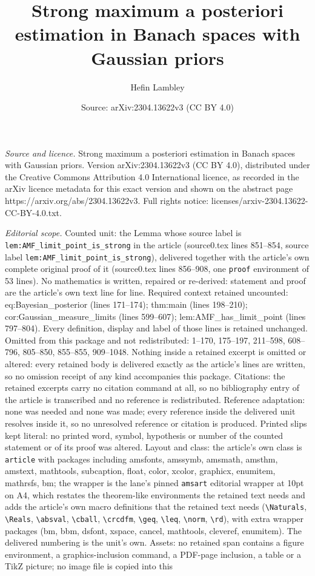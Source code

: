 \documentclass[10pt,a4paper]{amsart}
\title[Strong maximum a posteriori estimation in Banach spaces with]{Strong maximum a posteriori estimation in Banach spaces with Gaussian priors}
\author{Hefin Lambley}
\date{Source: arXiv:2304.13622v3 (CC BY 4.0)}
\begin{document}
\maketitle

\noindent\emph{Source and licence.} Strong maximum a posteriori estimation in Banach spaces with Gaussian priors. Version arXiv:2304.13622v3 (CC BY 4.0), distributed under the Creative Commons Attribution 4.0 International licence, as recorded in the arXiv licence metadata for this exact version and shown on the abstract page https://arxiv.org/abs/2304.13622v3. Full rights notice: licenses/arxiv-2304.13622-CC-BY-4.0.txt.\par\smallskip

\noindent\textit{Editorial scope.} Counted unit: the Lemma whose source label is \texttt{lem:AMF\_limit\_point\_is\_strong} in the article (source0.tex lines 851--854, source label \texttt{lem:AMF\_limit\_point\_is\_strong}), delivered together with the article's own complete original proof of it (source0.tex lines 856--908, one \texttt{proof} environment of 53 lines). No mathematics is written, repaired or re-derived: statement and proof are the article's own text line for line. Required context retained uncounted: eq:Bayesian\_posterior (lines 171--174); thm:main (lines 198--210); cor:Gaussian\_measure\_limits (lines 599--607); lem:AMF\_has\_limit\_point (lines 797--804). Every definition, display and label of those lines is retained unchanged. Omitted from this package and not redistributed: 1--170, 175--197, 211--598, 608--796, 805--850, 855--855, 909--1048. Nothing inside a retained excerpt is omitted or altered: every retained body is delivered exactly as the article's lines are written, so no omission receipt of any kind accompanies this package. Citations: the retained excerpts carry no citation command at all, so no bibliography entry of the article is transcribed and no reference is redistributed. Reference adaptation: none was needed and none was made; every reference inside the delivered unit resolves inside it, so no unresolved reference or citation is produced. Printed slips kept literal: no printed word, symbol, hypothesis or number of the counted statement or of its proof was altered. Layout and class: the article's own class is \texttt{article} with packages including amsfonts, amssymb, amsmath, amsthm, amstext, mathtools, subcaption, float, color, xcolor, graphicx, enumitem, mathrsfs, bm; the wrapper is the lane's pinned \texttt{amsart} editorial wrapper at 10pt on A4, which restates the theorem-like environments the retained text needs and adds the article's own macro definitions that the retained text needs (\texttt{\textbackslash Naturals}, \texttt{\textbackslash Reals}, \texttt{\textbackslash absval}, \texttt{\textbackslash cball}, \texttt{\textbackslash crcdfm}, \texttt{\textbackslash geq}, \texttt{\textbackslash leq}, \texttt{\textbackslash norm}, \texttt{\textbackslash rd}), with extra wrapper packages (bm, bbm, dsfont, xspace, cancel, mathtools, cleveref, enumitem). The delivered numbering is the unit's own. Assets: no retained span contains a figure environment, a graphics-inclusion command, a PDF-page inclusion, a table or a TikZ picture; no image file is copied into this 
\end{document}
